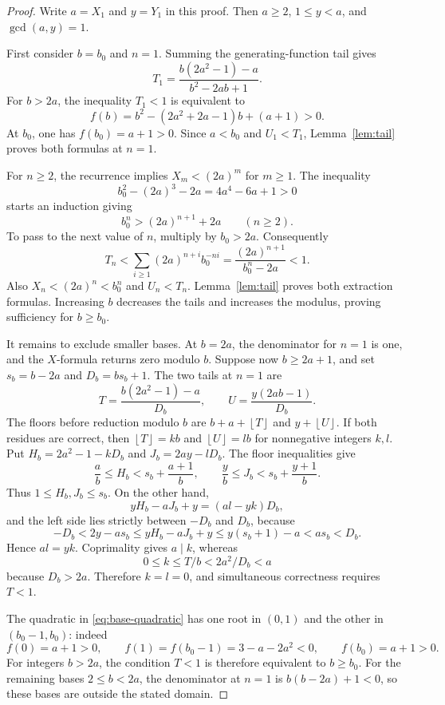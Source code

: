 \documentclass[10pt,a4paper]{amsart}
\newcommand{\fl}[1]{\left\lfloor #1\right\rfloor}
\theoremstyle{plain}
\theoremstyle{remark}
\begin{document}
\begin{proof}
Write $a=X_1$ and $y=Y_1$ in this proof. Then $a\ge2$,
$1\le y<a$, and $\gcd(a,y)=1$.

First consider $b=b_0$ and $n=1$. Summing the generating-function
tail gives
\[
  T_1=\frac{b(2a^2-1)-a}{b^2-2ab+1}.
\]
For $b>2a$, the inequality $T_1<1$ is equivalent to
\begin{equation}\label{eq:base-quadratic}
  f(b)=b^2-(2a^2+2a-1)b+(a+1)>0.
\end{equation}
At $b_0$, one has $f(b_0)=a+1>0$.
Since $a<b_0$ and $U_1<T_1$, Lemma~\ref{lem:tail} proves both
formulas at $n=1$.

For $n\ge2$, the recurrence implies $X_m<(2a)^m$ for $m\ge1$.
The inequality
\[
  b_0^2-(2a)^3-2a=4a^4-6a+1>0
\]
starts an induction giving
\[
  b_0^n>(2a)^{n+1}+2a\qquad(n\ge2).
\]
To pass to the next value of $n$, multiply by $b_0>2a$.
Consequently
\[
  T_n<\sum_{i\ge1}(2a)^{n+i}b_0^{-ni}
      =\frac{(2a)^{n+1}}{b_0^n-2a}<1.
\]
Also $X_n<(2a)^n<b_0^n$ and $U_n<T_n$.
Lemma~\ref{lem:tail} proves both extraction formulas.
Increasing $b$ decreases the tails and increases the modulus, proving
sufficiency for $b\ge b_0$.

It remains to exclude smaller bases. At $b=2a$, the denominator for
$n=1$ is one, and the $X$-formula returns zero modulo $b$.
Suppose now $b\ge2a+1$, and set $s_b=b-2a$ and $D_b=bs_b+1$.
The two tails at $n=1$ are
\[
  T=\frac{b(2a^2-1)-a}{D_b},\qquad
  U=\frac{y(2ab-1)}{D_b}.
\]
The floors before reduction modulo $b$ are
$b+a+\fl T$ and $y+\fl U$.
If both residues are correct, then
$\fl T=kb$ and $\fl U=lb$ for nonnegative integers $k,l$.
Put $H_b=2a^2-1-kD_b$ and $J_b=2ay-lD_b$.
The floor inequalities give
\[
  \frac ab\le H_b<s_b+\frac{a+1}{b},\qquad
  \frac yb\le J_b<s_b+\frac{y+1}{b}.
\]
Thus $1\le H_b,J_b\le s_b$.
On the other hand,
\[
  yH_b-aJ_b+y=(al-yk)D_b,
\]
and the left side lies strictly between $-D_b$ and $D_b$, because
\[
  -D_b<2y-as_b\le yH_b-aJ_b+y
       \le y(s_b+1)-a<as_b<D_b.
\]
Hence $al=yk$. Coprimality gives $a\mid k$, whereas
\[
  0\le k\le T/b<2a^2/D_b<a
\]
because $D_b>2a$. Therefore $k=l=0$, and simultaneous correctness
requires $T<1$.

The quadratic in \eqref{eq:base-quadratic} has one root in $(0,1)$
and the other in $(b_0-1,b_0)$: indeed
\[
  f(0)=a+1>0,\qquad
  f(1)=f(b_0-1)=3-a-2a^2<0,\qquad f(b_0)=a+1>0.
\]
For integers $b>2a$, the condition $T<1$ is therefore equivalent
to $b\ge b_0$.
For the remaining bases $2\le b<2a$, the denominator at $n=1$ is
$b(b-2a)+1<0$, so these bases are outside the stated domain.
\end{proof}
\end{document}
